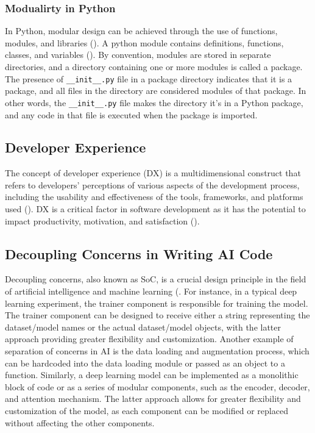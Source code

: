 \subsubsection{Modualirty in Python}
In Python, modular design can be achieved through the use of functions, modules, and libraries (\cite{sanner1999python}). 
A python module contains definitions, functions, classes, and variables (\cite{raschka2015python}). By convention, modules are stored in separate directories, and a directory containing one or more modules is called a package. The presence of \verb|__init__.py| file in a package directory indicates that it is a package, and all files in the directory are considered modules of that package. In other words, the \verb|__init__.py| file makes the directory it's in a Python package, and any code in that file is executed when the package is imported.



\subsection{Developer Experience}
The concept of developer experience (DX) is a multidimensional construct that refers to developers' perceptions of various aspects of the development process, including the usability and effectiveness of the tools, frameworks, and platforms used (\cite{fagerholm2012developer}). DX is a critical factor in software development as it has the potential to impact productivity, motivation, and satisfaction (\cite{fagerholm2012developer}).



\subsection{Decoupling Concerns in Writing AI Code}


Decoupling concerns, also known as SoC, is a crucial design principle in the field of artificial intelligence and machine learning (\cite{mo2016decoupling,qian2006decoupling, pressman2010software}. For instance, in a typical deep learning experiment, the trainer component is responsible for training the model. The trainer component can be designed to receive either a string representing the dataset/model names or the actual dataset/model objects, with the latter approach providing greater flexibility and customization. Another example of separation of concerns in AI is the data loading and augmentation process, which can be hardcoded into the data loading module or passed as an object to a function. Similarly, a deep learning model can be implemented as a monolithic block of code or as a series of modular components, such as the encoder, decoder, and attention mechanism. The latter approach allows for greater flexibility and customization of the model, as each component can be modified or replaced without affecting the other components.




